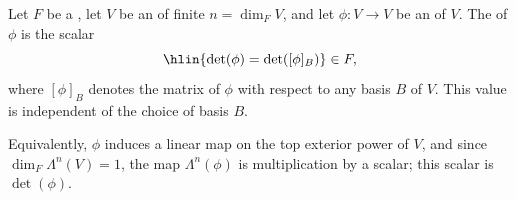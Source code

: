 \begin{definition} \label{definition:determinant_of_an_endomorphism_of_a_vector_space_over_a_field}
Let $F$ be a , let $V$ be an  of finite  $n = \dim_F V$, and let $\phi : V \to V$ be an  of $V$.
The  of $\phi$ is the scalar
$$\hlin{\det(\phi) = \det([\phi]_B)} \in F,$$
where $[\phi]_B$ denotes the matrix of $\phi$ with respect to any basis $B$ of $V$. This value is independent of the choice of basis $B$.

Equivalently, $\phi$ induces a linear map  on the top exterior power of $V$, and since $\dim_F \Lambda^n(V) = 1$, the map $\Lambda^n(\phi)$ is multiplication by a scalar; this scalar is $\det(\phi)$.
\end{definition}
